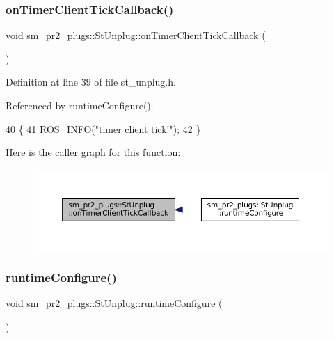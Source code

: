 \subsubsection{\texorpdfstring{on\+Timer\+Client\+Tick\+Callback()}{onTimerClientTickCallback()}}
{\footnotesize\ttfamily void sm\+\_\+pr2\+\_\+plugs\+::\+St\+Unplug\+::on\+Timer\+Client\+Tick\+Callback (\begin{DoxyParamCaption}{ }\end{DoxyParamCaption})\hspace{0.3cm}{\ttfamily [inline]}}



Definition at line 39 of file st\+\_\+unplug.\+h.



Referenced by runtime\+Configure().


\begin{DoxyCode}
40     \{
41         ROS\_INFO(\textcolor{stringliteral}{"timer client tick!"});
42     \}
\end{DoxyCode}
Here is the caller graph for this function\+:
\nopagebreak
\begin{figure}[H]
\begin{center}
\leavevmode
\includegraphics[width=350pt]{structsm__pr2__plugs_1_1StUnplug_ac3f670b50be1fcd8e3dc0f28f5fafab9_icgraph}
\end{center}
\end{figure}
\mbox{\label{structsm__pr2__plugs_1_1StUnplug_a9a9dac6ed575453e3bbfb115f99277be}} 
\subsubsection{\texorpdfstring{runtime\+Configure()}{runtimeConfigure()}}
{\footnotesize\ttfamily void sm\+\_\+pr2\+\_\+plugs\+::\+St\+Unplug\+::runtime\+Configure (\begin{DoxyParamCaption}{ }\end{DoxyParamCaption})\hspace{0.3cm}{\ttfamily [inline]}}



